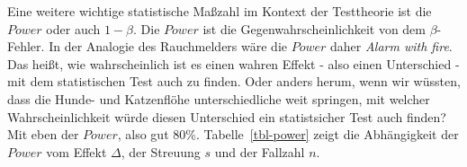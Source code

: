 \documentclass[
  letterpaper,
  DIV=11,
  oneside]{scrreport}
\begin{document}
Eine weitere wichtige statistische Maßzahl im Kontext der Testtheorie
ist die \(Power\) oder auch \(1-\beta\). Die \(Power\) ist die
Gegenwahrscheinlichkeit von dem \(\beta\)-Fehler. In der Analogie des
Rauchmelders wäre die \(Power\) daher \emph{Alarm with fire}. Das heißt,
wie wahrscheinlich ist es einen wahren Effekt - also einen Unterschied -
mit dem statistischen Test auch zu finden. Oder anders herum, wenn wir
wüssten, dass die Hunde- und Katzenflöhe unterschiedliche weit springen,
mit welcher Wahrscheinlichkeit würde diesen Unterschied ein
statistsicher Test auch finden? Mit eben der \(Power\), also gut 80\%.
Tabelle~\ref{tbl-power} zeigt die Abhängigkeit der \(Power\) vom Effekt
\(\Delta\), der Streuung \(s\) und der Fallzahl \(n\).

{}
\end{document}
